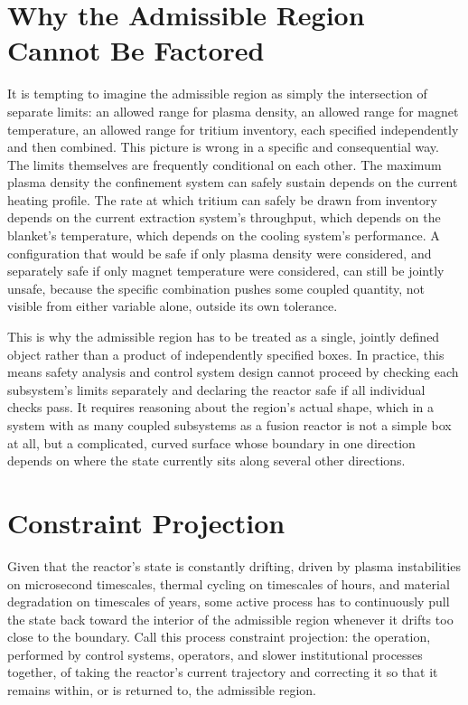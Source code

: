 \section{Why the Admissible Region Cannot Be Factored}

It is tempting to imagine the admissible region as simply the intersection of separate limits: an allowed range for plasma density, an allowed range for magnet temperature, an allowed range for tritium inventory, each specified independently and then combined. This picture is wrong in a specific and consequential way. The limits themselves are frequently conditional on each other. The maximum plasma density the confinement system can safely sustain depends on the current heating profile. The rate at which tritium can safely be drawn from inventory depends on the current extraction system's throughput, which depends on the blanket's temperature, which depends on the cooling system's performance. A configuration that would be safe if only plasma density were considered, and separately safe if only magnet temperature were considered, can still be jointly unsafe, because the specific combination pushes some coupled quantity, not visible from either variable alone, outside its own tolerance.

This is why the admissible region has to be treated as a single, jointly defined object rather than a product of independently specified boxes. In practice, this means safety analysis and control system design cannot proceed by checking each subsystem's limits separately and declaring the reactor safe if all individual checks pass. It requires reasoning about the region's actual shape, which in a system with as many coupled subsystems as a fusion reactor is not a simple box at all, but a complicated, curved surface whose boundary in one direction depends on where the state currently sits along several other directions.

\section{Constraint Projection}

Given that the reactor's state is constantly drifting, driven by plasma instabilities on microsecond timescales, thermal cycling on timescales of hours, and material degradation on timescales of years, some active process has to continuously pull the state back toward the interior of the admissible region whenever it drifts too close to the boundary. Call this process constraint projection: the operation, performed by control systems, operators, and slower institutional processes together, of taking the reactor's current trajectory and correcting it so that it remains within, or is returned to, the admissible region.

